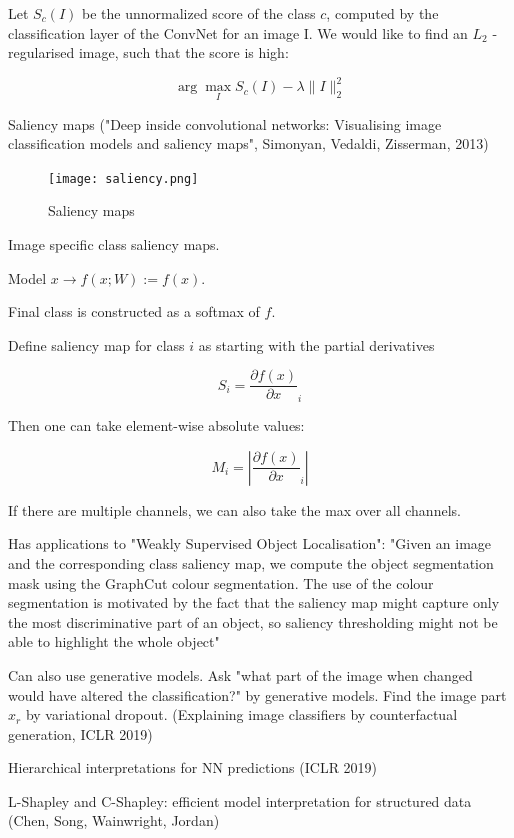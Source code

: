 \documentclass[english]{article}
\begin{document}
Let $S_c(I)$ be the unnormalized score of the class $c$, computed by the classification layer of the ConvNet for an image I. We would like to find an $L_2$  - regularised image, such that the score is
high:

$$\arg\max_I
S_c(I) - \lambda \|I\|_2^2 
$$

\item  Saliency maps ("Deep inside convolutional networks: Visualising image classification models and saliency maps", Simonyan, Vedaldi, Zisserman, 2013)


\begin{figure}
  \centering
  \texttt{[image: saliency.png]}
  \caption{Saliency maps}
  \label{saliency}
\end{figure}


Image specific class saliency maps. 

Model $x \to f(x;W):=f(x)$. 

Final class is constructed as a softmax of $f$.

Define saliency map for class $i$ as starting with the partial derivatives

$$S_i = \frac{\partial f(x)}{\partial x}_i$$

Then one can take element-wise absolute values: 

$$M_i = |\frac{\partial f(x)}{\partial x}_i|$$

If there are multiple channels, we can also take the max over all channels.

Has applications to "Weakly Supervised Object Localisation":  "Given an image and the corresponding class saliency map, we compute the object segmentation mask
using the GraphCut colour segmentation. The use of the colour segmentation is motivated by the
fact that the saliency map might capture only the most discriminative part of an object, so saliency
thresholding might not be able to highlight the whole object"

\item Can also use generative models. Ask "what part of the image when changed would have altered the classification?" by generative models. Find the image part $x_r$ by variational dropout. (Explaining image classifiers by counterfactual generation, ICLR 2019) 


\item Hierarchical interpretations for NN predictions (ICLR 2019)

\item L-Shapley and C-Shapley: efficient model interpretation for structured data (Chen, Song, Wainwright, Jordan)
\end{document}
